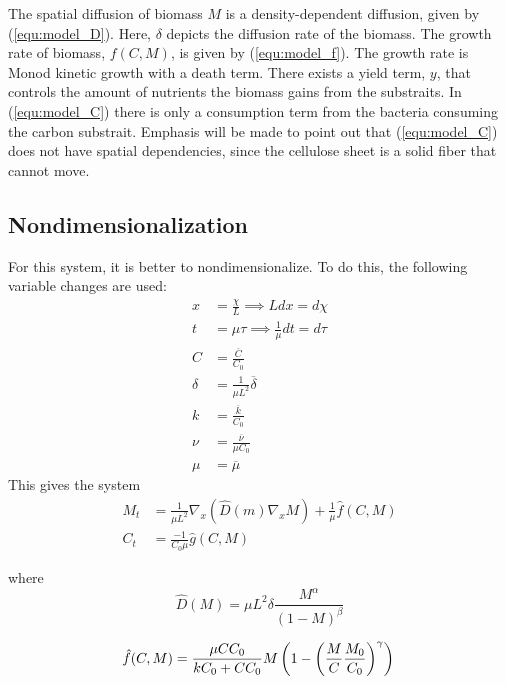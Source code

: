 \documentclass{article}
\theoremstyle{plain}
\begin{document}
  The spatial diffusion of biomass $M$ is a density-dependent diffusion, given by (\ref{equ:model_D}).
  Here, $\delta$ depicts the diffusion rate of the biomass.
  The growth rate of biomass, ${f}({C},M)$, is given by (\ref{equ:model_f}). 
  The growth rate is Monod kinetic growth with a death term.
  There exists a yield term, $y$, that controls the amount of nutrients the biomass gains from the substraits. 
  In (\ref{equ:model_C}) there is only a consumption term from the bacteria consuming the carbon substrait. 
  Emphasis will be made to point out that (\ref{equ:model_C}) does not have spatial dependencies, since the cellulose sheet is a solid fiber that cannot move.
  
  \subsection {Nondimensionalization}
  For this system, it is better to nondimensionalize. To do this, the following variable changes are used:
  \begin{align}
    x &= \frac{\chi}{L} \implies L dx = d\chi\\
    t &= \mu \tau \implies \frac{1}{\mu} dt= d\tau\\
    C &= \frac{\overline{C}}{C_0} \\
    \delta &= \frac{1}{\mu L^2} \overline{\delta} \\
    k &= \frac{\overline{k}}{C_0} \\
    \nu &= \frac{\overline{\nu}}{\mu C_0} \\
    \mu &= \overline{\mu}
  \end{align}
  This gives the system
  \begin{align}
    M_t &= \frac{1}{\mu L^2} \nabla_x \left(\hat{D}(m) \nabla_x M \right) + \frac{1}{\mu} \hat{f}(C,M) \\
    C_t &= \frac{ -1}{C_0 \mu} \hat{g}(C,M)
  \end{align}
  
  where 
  \begin{equation}
    \hat{D}(M) = {\mu L^2 \delta} \frac{M^\alpha}{(1-M)^\beta}
  \end{equation}
  
  \begin{equation}
    \hat{f}({C},M) = \frac{{\mu} {C C_0}}{{k C_0} + {C C_0}} M \left(1 - \left( \frac{M}{{C}} \frac{M_0}{C_0} \right)^\gamma \right) \\
  \end{equation}
  
\end{document}
